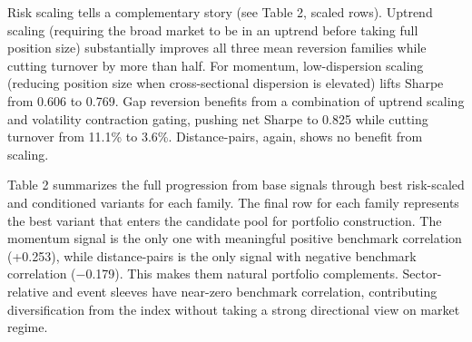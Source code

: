 Risk scaling tells a complementary story (see Table 2, scaled rows). Uptrend scaling (requiring the broad market to be in an uptrend before taking full position size) substantially improves all three mean reversion families while cutting turnover by more than half. For momentum, low-dispersion scaling (reducing position size when cross-sectional dispersion is elevated) lifts Sharpe from 0.606 to 0.769. Gap reversion benefits from a combination of uptrend scaling and volatility contraction gating, pushing net Sharpe to 0.825 while cutting turnover from 11.1\% to 3.6\%. Distance-pairs, again, shows no benefit from scaling.

Table 2 summarizes the full progression from base signals through best risk-scaled and conditioned variants for each family. The final row for each family represents the best variant that enters the candidate pool for portfolio construction. The momentum signal is the only one with meaningful positive benchmark correlation (+0.253), while distance-pairs is the only signal with negative benchmark correlation ($-$0.179). This makes them natural portfolio complements. Sector-relative and event sleeves have near-zero benchmark correlation, contributing diversification from the index without taking a strong directional view on market regime.

